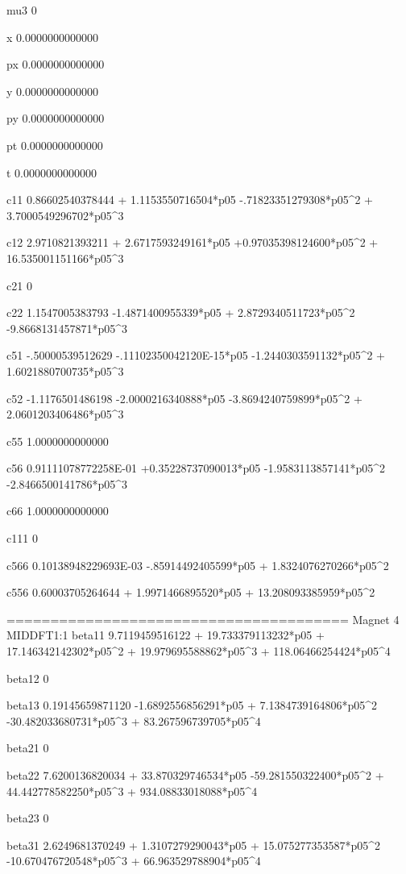  mu3    
 0 
  
 x      
   0.0000000000000 
  
 px     
   0.0000000000000 
  
 y      
   0.0000000000000 
  
 py     
   0.0000000000000 
  
 pt     
   0.0000000000000 
  
 t      
   0.0000000000000 
  
 c11
  0.86602540378444 + 1.1153550716504*p05  -.71823351279308*p05^2 + 3.7000549296702*p05^3 
  
 c12
   2.9710821393211 + 2.6717593249161*p05 +0.97035398124600*p05^2 + 16.535001151166*p05^3 
  
 c21
 0 
  
 c22
   1.1547005383793  -1.4871400955339*p05 + 2.8729340511723*p05^2  -9.8668131457871*p05^3 
  
 c51
  -.50000539512629  -.11102350042120E-15*p05  -1.2440303591132*p05^2 + 1.6021880700735*p05^3 
  
 c52
  -1.1176501486198  -2.0000216340888*p05  -3.8694240759899*p05^2 + 2.0601203406486*p05^3 
  
 c55
   1.0000000000000 
  
 c56
  0.91111078772258E-01 +0.35228737090013*p05  -1.9583113857141*p05^2  -2.8466500141786*p05^3 
  
 c66
   1.0000000000000 
  
 c111
 0 
  
 c566
  0.10138948229693E-03  -.85914492405599*p05 + 1.8324076270266*p05^2 
  
 c556
  0.60003705264644 + 1.9971466895520*p05 + 13.208093385959*p05^2 
  
 =======================================
 Magnet  4  MIDDFT1:1       
 beta11 
   9.7119459516122 + 19.733379113232*p05 + 17.146342142302*p05^2 + 19.979695588862*p05^3 + 118.06466254424*p05^4 
  
 beta12 
 0 
  
 beta13 
  0.19145659871120  -1.6892556856291*p05 + 7.1384739164806*p05^2  -30.482033680731*p05^3 + 83.267596739705*p05^4 
  
 beta21 
 0 
  
 beta22 
   7.6200136820034 + 33.870329746534*p05  -59.281550322400*p05^2 + 44.442778582250*p05^3 + 934.08833018088*p05^4 
  
 beta23 
 0 
  
 beta31 
   2.6249681370249 + 1.3107279290043*p05 + 15.075277353587*p05^2  -10.670476720548*p05^3 + 66.963529788904*p05^4 
  

